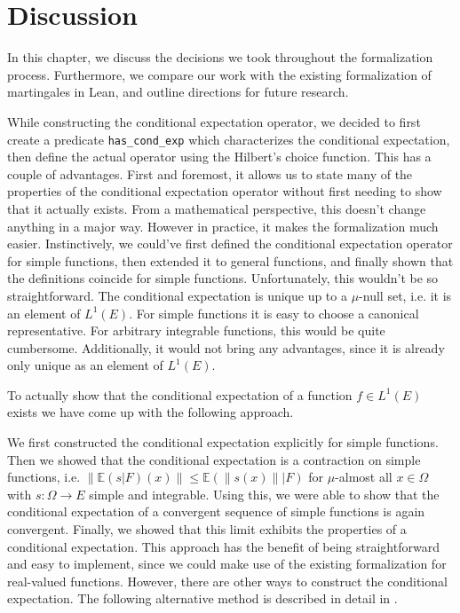 
\chapter{Discussion}\label{chapter:discussion}

In this chapter, we discuss the decisions we took throughout the formalization process. Furthermore, we compare our work with the existing formalization of martingales in Lean, and outline directions for future research.

While constructing the conditional expectation operator, we decided to first create a predicate \texttt{has\_cond\_exp} which characterizes the conditional expectation, then define the actual operator using the Hilbert's choice function. This has a couple of advantages. First and foremost, it allows us to state many of the properties of the conditional expectation operator without first needing to show that it actually exists. From a mathematical perspective, this doesn't change anything in a major way. However in practice, it makes the formalization much easier. Instinctively, we could've first defined the conditional expectation operator for simple functions, then extended it to general functions, and finally shown that the definitions coincide for simple functions. Unfortunately, this wouldn't be so straightforward. The conditional expectation is unique up to a $\mu$-null set, i.e. it is an element of $L^1(E)$. For simple functions it is easy to choose a canonical representative. For arbitrary integrable functions, this would be quite cumbersome. Additionally, it would not bring any advantages, since it is already only unique as an element of $L^1(E)$. 

To actually show that the conditional expectation of a function $f \in L^1(E)$ exists we have come up with the following approach. 

We first constructed the conditional expectation explicitly for simple functions. Then we showed that the conditional expectation is a contraction on simple functions, i.e. $\lVert \mathbb{E}(s \vert F)(x) \rVert \le \mathbb{E}(\lVert s(x) \rVert \vert F)$ for $\mu$-almost all $x \in \Omega$ with $s : \Omega \rightarrow E$ simple and integrable. Using this, we were able to show that the conditional expectation of a convergent sequence of simple functions is again convergent. Finally, we showed that this limit exhibits the properties of a conditional expectation. This approach has the benefit of being straightforward and easy to implement, since we could make use of the existing formalization for real-valued functions. However, there are other ways to construct the conditional expectation. The following alternative method is described in detail in \cite{Hytoenen_2016}.

